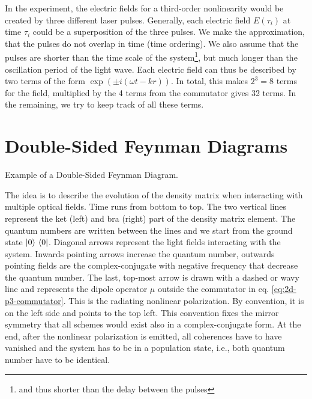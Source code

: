 In the experiment, the electric fields for a third-order nonlinearity would be created by three different laser pulses. Generally, each  electric field $E(\tau_i)$ at time $\tau_i$ could be a superposition of the three pulses. We make the approximation, that the pulses do not overlap in time (time ordering). We also assume that the pulses are shorter  than the time scale of the system\footnote{and thus shorter than the delay between the pulses}, but much longer than the oscillation period of the light wave. Each electric field can thus be described by two terms of the form $\exp( \pm i (\omega t - k r) )$. In total, this makes $2^3=8$ terms for the field, multiplied by the 4 terms from the commutator gives 32 terms.
In the remaining, we try to keep track of all these terms.


\section{Double-Sided Feynman Diagrams}

\begin{marginfigure}
\caption{
Example of a Double-Sided Feynman Diagram.}
\label{fig:2d_example_feynman}
\end{marginfigure}

The idea is to describe the evolution of the density matrix when interacting with multiple optical fields.
Time runs from bottom to top. The two vertical lines represent the ket (left) and bra (right) part of the density matrix element. The quantum numbers are written between the lines and we start from the ground state $\ket{0}\, \bra{0}$. Diagonal arrows represent the light fields interacting with the system. Inwards pointing arrows increase the quantum number, outwards pointing fields are the complex-conjugate with negative frequency that decrease the quantum number. The last, top-most arrow is drawn with a dashed or wavy line and represents the dipole operator $\mu$ outside the commutator in eq. \ref{eq:2d-p3-commutator}. This is the radiating nonlinear polarization. By convention, it is on the left side and points to the top left. This convention fixes the mirror symmetry that all schemes would exist also in a complex-conjugate form. At the end, after the nonlinear polarization is emitted, all coherences have to have vanished and the system has to be in a population state, i.e., both quantum number have to be identical.




